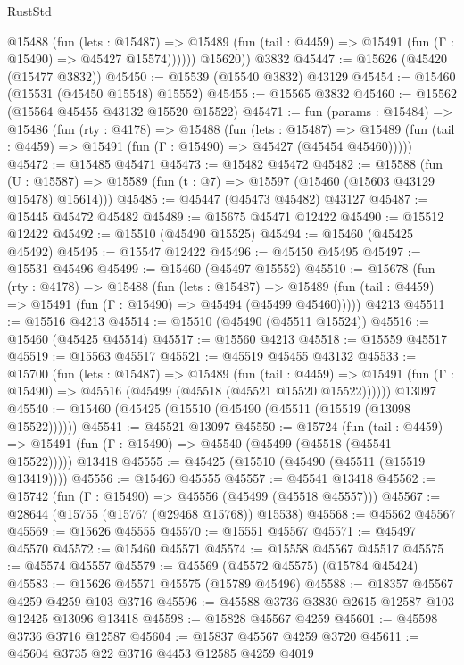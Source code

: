 \begin{lexlean}{RustStd}
\begin{coremodule}
            @15488
              (fun (lets : @15487) =>
              @15489 (fun (tail : @4459) => @15491 (fun (Γ : @15490) => @45427 @15574))))))
        @15620))
    @3832
@45447 := @15626 (@45420 (@15477 @3832))
@45450 := @15539 (@15540 @3832) @43129
@45454 := @15460 (@15531 (@45450 @15548) @15552)
@45455 := @15565 @3832
@45460 := @15562 (@15564 @45455 @43132 @15520 @15522)
@45471 := fun (params : @15484) =>
  @15486
    (fun (rty : @4178) =>
    @15488
      (fun (lets : @15487) =>
      @15489 (fun (tail : @4459) => @15491 (fun (Γ : @15490) => @45427 (@45454 @45460)))))
@45472 := @15485 @45471
@45473 := @15482 @45472
@45482 := @15588
    (fun (U : @15587) => @15589 (fun (t : @7) => @15597 (@15460 (@15603 @43129 @15478) @15614)))
@45485 := @45447 (@45473 @45482) @43127
@45487 := @15445 @45472 @45482
@45489 := @15675 @45471 @12422
@45490 := @15512 @12422
@45492 := @15510 (@45490 @15525)
@45494 := @15460 (@45425 @45492)
@45495 := @15547 @12422
@45496 := @45450 @45495
@45497 := @15531 @45496
@45499 := @15460 (@45497 @15552)
@45510 := @15678
    (fun (rty : @4178) =>
    @15488
      (fun (lets : @15487) =>
      @15489 (fun (tail : @4459) => @15491 (fun (Γ : @15490) => @45494 (@45499 @45460)))))
    @4213
@45511 := @15516 @4213
@45514 := @15510 (@45490 (@45511 @15524))
@45516 := @15460 (@45425 @45514)
@45517 := @15560 @4213
@45518 := @15559 @45517
@45519 := @15563 @45517
@45521 := @45519 @45455 @43132
@45533 := @15700
    (fun (lets : @15487) =>
    @15489
      (fun (tail : @4459) =>
      @15491 (fun (Γ : @15490) => @45516 (@45499 (@45518 (@45521 @15520 @15522))))))
    @13097
@45540 := @15460 (@45425 (@15510 (@45490 (@45511 (@15519 (@13098 @15522))))))
@45541 := @45521 @13097
@45550 := @15724
    (fun (tail : @4459) => @15491 (fun (Γ : @15490) => @45540 (@45499 (@45518 (@45541 @15522)))))
    @13418
@45555 := @45425 (@15510 (@45490 (@45511 (@15519 @13419))))
@45556 := @15460 @45555
@45557 := @45541 @13418
@45562 := @15742 (fun (Γ : @15490) => @45556 (@45499 (@45518 @45557)))
@45567 := @28644 (@15755 (@15767 (@29468 @15768)) @15538)
@45568 := @45562 @45567
@45569 := @15626 @45555
@45570 := @15551 @45567
@45571 := @45497 @45570
@45572 := @15460 @45571
@45574 := @15558 @45567 @45517
@45575 := @45574 @45557
@45579 := @45569 (@45572 @45575) (@15784 @45424)
@45583 := @15626 @45571 @45575 (@15789 @45496)
@45588 := @18357 @45567 @4259 @4259 @103 @3716
@45596 := @45588 @3736 @3830 @2615 @12587 @103 @12425 @13096 @13418
@45598 := @15828 @45567 @4259
@45601 := @45598 @3736 @3716 @12587
@45604 := @15837 @45567 @4259 @3720
@45611 := @45604 @3735 @22 @3716 @4453 @12585 @4259 @4019

\end{coremodule}
\end{lexlean}
